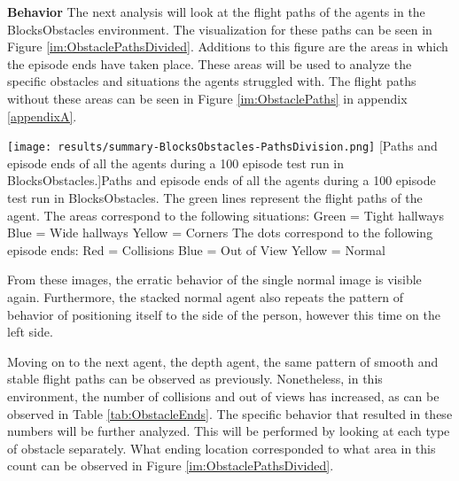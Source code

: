 \noindent
\textbf{Behavior} \newline
The next analysis will look at the flight paths of the agents in the BlocksObstacles environment. 
The visualization for these paths can be seen in Figure 
\ref{im:ObstaclePathsDivided}. Additions to this figure are the areas in which the episode 
ends have taken place. These areas will be used to analyze the specific obstacles and 
situations the agents struggled with. The flight paths without these areas can be seen in 
Figure \ref{im:ObstaclePaths} in appendix \ref{appendixA}. \newline


\begin{SCfigure}[][h]
    \centering
    \texttt{[image: results/summary-BlocksObstacles-PathsDivision.png]}
    [Paths and episode ends of all the agents during a 100 episode test run in BlocksObstacles.]{Paths and episode ends of all the agents during a 100 episode test run in BlocksObstacles. 
    The green lines represent the flight paths of the agent.\newline\newline
    The areas correspond to the following situations: \newline
    Green = Tight hallways\newline
    Blue = Wide hallways \newline
    Yellow = Corners \newline\newline
    The dots correspond to the following episode ends: \newline
    Red = Collisions\newline
    Blue = Out of View \newline
    Yellow = Normal\newline\newline\newline\newline\newline\newline}
    \label{im:ObstaclePathsDivided}
\end{SCfigure}

From these images, the erratic behavior of the single normal image is visible again.
Furthermore, the stacked normal agent also repeats the pattern of behavior of 
positioning itself to the side of the person, however this time on the left side. 

Moving on to the next agent, the depth agent, the same pattern of smooth 
and stable flight paths can be observed as previously. Nonetheless, in this 
environment, the number of collisions and out of views has increased, as can 
be observed in Table \ref{tab:ObstacleEnds}. The specific behavior that resulted 
in these numbers will be further analyzed. This will be performed by looking at each 
type of obstacle separately. What ending location corresponded to what area
in this count can be observed in Figure \ref{im:ObstaclePathsDivided}. \newline


